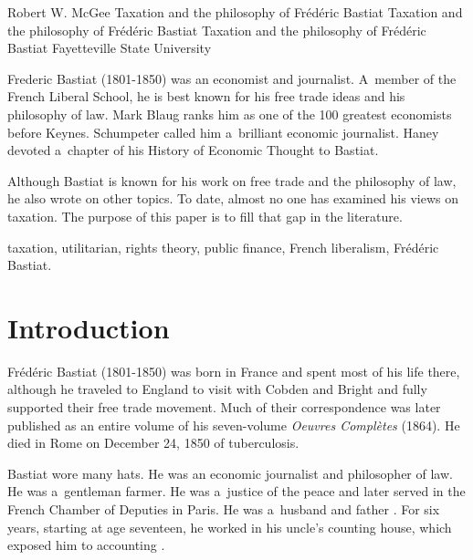 \begin{artengenv}{Robert W. McGee}
	{Taxation and the philosophy of Frédéric Bastiat}
	{Taxation and the philosophy of Frédéric Bastiat}
	{Taxation and the philosophy of Frédéric Bastiat}
	{Fayetteville State University\label{mcgee-first}}
	{Frederic Bastiat (1801-1850) was an economist and journalist. A~member of the French Liberal School, he is best known for his free trade ideas and his philosophy of law. Mark Blaug ranks him as one of the 100 greatest economists before Keynes. Schumpeter called him a~brilliant economic journalist. Haney devoted a~chapter of his History of Economic Thought to Bastiat.
	
	
	
	Although Bastiat is known for his work on free trade and the philosophy of law, he also wrote on other topics. To date, almost no one has examined his views on taxation. The purpose of this paper is to fill that gap in the literature.
	}
	{taxation, utilitarian, rights theory, public finance, French liberalism, Frédéric Bastiat.}






\section{Introduction}

\lettrine[loversize=0.13,lines=2,lraise=-0.03,nindent=0em,findent=0.2pt]%
{F}{}rédéric Bastiat (1801-1850) was born in France and spent most of his life there, although he traveled to England to visit with Cobden and Bright and fully supported their free trade movement. Much of their correspondence was later published as an entire volume of his seven-volume \textit{Oeuvres Complètes} (1864). He died in Rome on December 24, 1850 of tuberculosis.



Bastiat wore many hats. He was an economic journalist and philosopher of law. He was a~gentleman farmer. He was a~justice of the peace and later served in the French Chamber of Deputies in Paris. He was a~husband and father 
\parencites[][]{bidet_frederic_1906}[][]{bastiat_f_1889}[][]{haney_history_1949}[][]{imbert_frederic_1913}[][]{nouvion_frederic_1905}[][]{roche_frederic_1971}[][]{roche_free_1993}[][]{ronce_frederic_1905}[][]{russell_frederic_1959}[][]{russell_frederic_1969}. %
 For six years, starting at age seventeen, he worked in his uncle's counting house, which exposed him to accounting 
\parencite[][p.xi]{bastiat_introduction_1964}.%





\end{artengenv}
